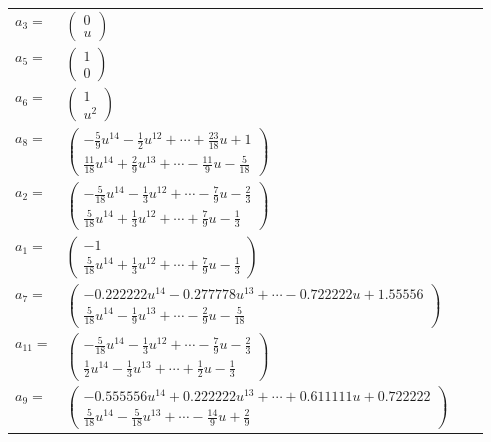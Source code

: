 \documentclass[1p]{elsarticle_modified}
\theoremstyle{definition}
\begin{document}
\begin{tabular}{m{7pt} m{180pt} m{7pt} m{180pt} }
\flushright $a_{3}=$&$\begin{pmatrix}0\\u\end{pmatrix}$ \\
\flushright $a_{5}=$&$\begin{pmatrix}1\\0\end{pmatrix}$ \\
\flushright $a_{6}=$&$\begin{pmatrix}1\\u^2\end{pmatrix}$ \\
\flushright $a_{8}=$&$\begin{pmatrix}-\frac{5}{9} u^{14}-\frac{1}{2} u^{12}+\cdots+\frac{23}{18} u+1\\\frac{11}{18} u^{14}+\frac{2}{9} u^{13}+\cdots-\frac{11}{9} u-\frac{5}{18}\end{pmatrix}$ \\
\flushright $a_{2}=$&$\begin{pmatrix}-\frac{5}{18} u^{14}-\frac{1}{3} u^{12}+\cdots-\frac{7}{9} u-\frac{2}{3}\\\frac{5}{18} u^{14}+\frac{1}{3} u^{12}+\cdots+\frac{7}{9} u-\frac{1}{3}\end{pmatrix}$ \\
\flushright $a_{1}=$&$\begin{pmatrix}-1\\\frac{5}{18} u^{14}+\frac{1}{3} u^{12}+\cdots+\frac{7}{9} u-\frac{1}{3}\end{pmatrix}$ \\
\flushright $a_{7}=$&$\begin{pmatrix}-0.222222 u^{14}-0.277778 u^{13}+\cdots-0.722222 u+1.55556\\\frac{5}{18} u^{14}-\frac{1}{9} u^{13}+\cdots-\frac{2}{9} u-\frac{5}{18}\end{pmatrix}$ \\
\flushright $a_{11}=$&$\begin{pmatrix}-\frac{5}{18} u^{14}-\frac{1}{3} u^{12}+\cdots-\frac{7}{9} u-\frac{2}{3}\\\frac{1}{2} u^{14}-\frac{1}{3} u^{13}+\cdots+\frac{1}{2} u-\frac{1}{3}\end{pmatrix}$ \\
\flushright $a_{9}=$&$\begin{pmatrix}-0.555556 u^{14}+0.222222 u^{13}+\cdots+0.611111 u+0.722222\\\frac{5}{18} u^{14}-\frac{5}{18} u^{13}+\cdots-\frac{14}{9} u+\frac{2}{9}\end{pmatrix}$ \\

\end{tabular}
\end{document}
